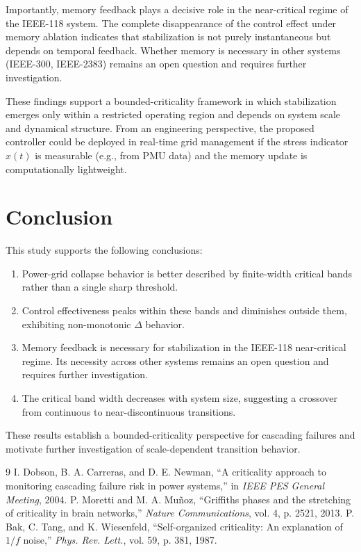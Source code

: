 \documentclass[11pt]{article}
\begin{document}
Importantly, memory feedback plays a decisive role in the near-critical regime of the IEEE-118 system. The complete disappearance of the control effect under memory ablation indicates that stabilization is not purely instantaneous but depends on temporal feedback. Whether memory is necessary in other systems (IEEE-300, IEEE-2383) remains an open question and requires further investigation.

These findings support a bounded-criticality framework in which stabilization emerges only within a restricted operating region and depends on system scale and dynamical structure. From an engineering perspective, the proposed controller could be deployed in real-time grid management if the stress indicator $x(t)$ is measurable (e.g., from PMU data) and the memory update is computationally lightweight.

\section{Conclusion}

This study supports the following conclusions:
\begin{enumerate}
    \item Power-grid collapse behavior is better described by finite-width critical bands rather than a single sharp threshold.
    \item Control effectiveness peaks within these bands and diminishes outside them, exhibiting non-monotonic $\Delta$ behavior.
    \item Memory feedback is necessary for stabilization in the IEEE-118 near-critical regime. Its necessity across other systems remains an open question and requires further investigation.
    \item The critical band width decreases with system size, suggesting a crossover from continuous to near-discontinuous transitions.
\end{enumerate}
These results establish a bounded-criticality perspective for cascading failures and motivate further investigation of scale-dependent transition behavior.

\begin{thebibliography}{9}
 I. Dobson, B. A. Carreras, and D. E. Newman, ``A criticality approach to monitoring cascading failure risk in power systems,'' in \textit{IEEE PES General Meeting}, 2004.
 P. Moretti and M. A. Muñoz, ``Griffiths phases and the stretching of criticality in brain networks,'' \textit{Nature Communications}, vol. 4, p. 2521, 2013.
 P. Bak, C. Tang, and K. Wiesenfeld, ``Self-organized criticality: An explanation of $1/f$ noise,'' \textit{Phys. Rev. Lett.}, vol. 59, p. 381, 1987.
\end{thebibliography}
\end{document}
